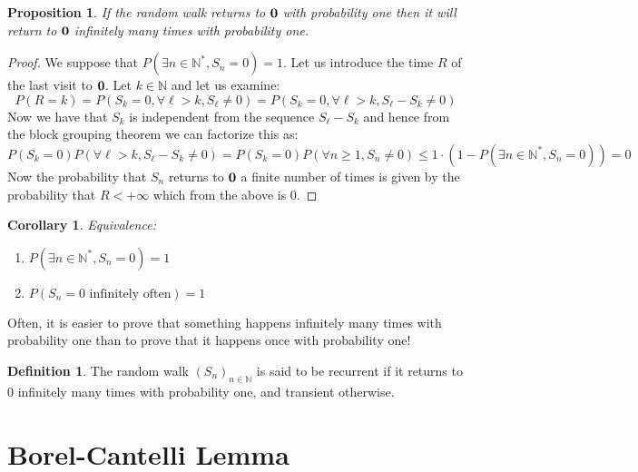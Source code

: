\documentclass[10pt,a4paper]{book}
\newtheorem{corollary}{Corollary}[theorem]
\newtheorem{proposition}{Proposition}[section]
\theoremstyle{definition}
\newtheorem{definition}{Definition}[section]
\begin{document}
\begin{proposition}
If the random walk returns to $\vb{0}$ with probability one then it will return to $\vb{0}$ infinitely many times with probability one. 
\end{proposition}

\begin{proof}
We suppose that $P(\exists n \in \mathbb{N}^*, S_n = 0) = 1$. Let us introduce the time $R$ of the last visit to $\vb{0}$. Let $k \in \mathbb{N}$ and let us examine:
\[
P(R = k) = P(S_k = 0, \forall \ell > k, S_\ell \neq 0) = P(S_k = 0, \forall \ell > k, S_\ell - S_k \neq 0)
\]
Now we have that $S_k$ is independent from the sequence $S_\ell - S_k$ and hence from the block grouping theorem we can factorize this as:
\[
P(S_k = 0)P(\forall \ell > k, S_\ell - S_k \neq 0) = P(S_k = 0)P(\forall n \geq 1, S_n \neq 0) \leq 1 \cdot (1 - P(\exists n \in \mathbb{N}^*, S_n = 0)) = 0
\]
Now the probability that $S_n$ returns to $\vb{0}$ a finite number of times is given by the probability that $R < +\infty$ which from the above is 0.

\end{proof}

\begin{corollary}

Equivalence:

\begin{enumerate}

\item $P(\exists n\in\mathbb{N}^*, S_n=0)=1$

\item $P(S_n=0\text{ infinitely often})=1$

\end{enumerate}

\end{corollary}


Often, it is easier to prove that something happens infinitely many times with probability one than to prove that it happens once with probability one!


\begin{definition}

The random walk $(S_n)_{n\in\mathbb{N}}$ is said to be recurrent if it returns to 0 infinitely many times with probability one, and transient otherwise. 

\end{definition}


\section{Borel-Cantelli Lemma}
\end{document}
